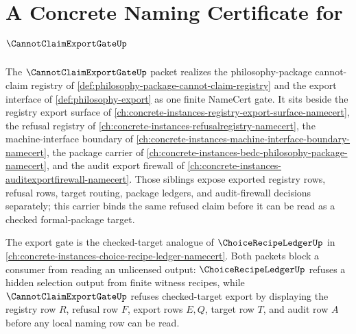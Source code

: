 \chapter{A Concrete Naming Certificate for $\CannotClaimExportGateUp$}
\label{ch:concrete-instances-cannot-claim-export-gate-namecert}

The $\CannotClaimExportGateUp$ packet realizes the philosophy-package cannot-claim registry of \autoref{def:philosophy-package-cannot-claim-registry} and the export interface of \autoref{def:philosophy-export} as one finite NameCert gate. It sits beside the registry export surface of \autoref{ch:concrete-instances-registry-export-surface-namecert}, the refusal registry of \autoref{ch:concrete-instances-refusalregistry-namecert}, the machine-interface boundary of \autoref{ch:concrete-instances-machine-interface-boundary-namecert}, the package carrier of \autoref{ch:concrete-instances-bedc-philosophy-package-namecert}, and the audit export firewall of \autoref{ch:concrete-instances-auditexportfirewall-namecert}. Those siblings expose exported registry rows, refusal rows, target routing, package ledgers, and audit-firewall decisions separately; this carrier binds the same refused claim before it can be read as a checked formal-package target.

The export gate is the checked-target analogue of $\ChoiceRecipeLedgerUp$ in \autoref{ch:concrete-instances-choice-recipe-ledger-namecert}. Both packets block a consumer from reading an unlicensed output: $\ChoiceRecipeLedgerUp$ refuses a hidden selection output from finite witness recipes, while $\CannotClaimExportGateUp$ refuses checked-target export by displaying the registry row $R$, refusal row $F$, export rows $E,Q$, target row $T$, and audit row $A$ before any local naming row can be read.

